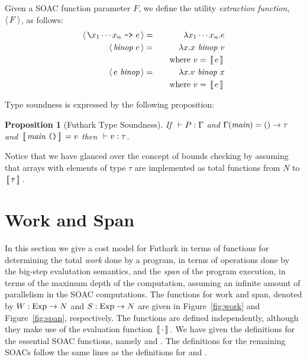 \documentclass[oneside,11pt]{book}
\newtheorem{proposition}{Proposition}
\begin{document}
Given a SOAC function parameter $F$, we define the utility \emph{extraction function}, $\langle\,F\,\rangle$, as follows:
\begin{eqnarray*}
  \langle\,\texttt{\textbackslash}x_1\cdots x_n~\texttt{->}~ e\,\rangle & = & \lambda x_1 \cdots x_n . e \\
  \langle\,\mbox{\it{binop}}~e\,\rangle & = & \lambda x . x~\mbox{\it{binop}}~v \\
    & & ~~~\mathrm{where}~v = \,[\![\,e\,]\!]\, \\
  \langle\,e~\mbox{\it{binop}}\,\rangle & = & \lambda x . v~\mbox{\it{binop}}~x \\
    & & ~~~\mathrm{where}~v = \,[\![\,e\,]\!]\,
\end{eqnarray*}

Type soundness is expressed by the following proposition:

\begin{proposition}[Futhark Type Soundness]
  If $~\vdash P : \Gamma$ and $\Gamma(\mbox{\it{main}}) = () \rightarrow \tau$ and
  $\,[\![\,\mbox{\it{main}}~\texttt{()}\,]\!]\, = v$ then $~\vdash v : \tau$.
\end{proposition}

Notice that we have glanced over the concept of bounds checking by
assuming that arrays with elements of type $\tau$ are implemented as
total functions from $N$ to $\,[\![\,\tau\,]\!]\,$.

\section{Work and Span}

In this section we give a cost model for Futhark in terms of functions
for determining the total \emph{work} done by a program, in terms of
operations done by the big-step evalutation semantics, and the
\emph{span} of the program execution, in terms of the maximum depth of
the computation, assuming an infinite amount of parallelism in the
SOAC computations. The functions for work and span, denoted by
$W : \mathrm{Exp} \rightarrow N$ and
$S : \mathrm{Exp} \rightarrow N$ are given in Figure~\ref{fig:work}
and Figure~\ref{fig:span}, respectively. The functions are defined
independently, although they make use of the evaluation function
$\,[\![\,\cdot\,]\!]\,$. We have given the definitions for the essential SOAC
functions, namely  and . The definitions for the
remaining SOACs follow the same lines as the definitions for 
and .
\end{document}
